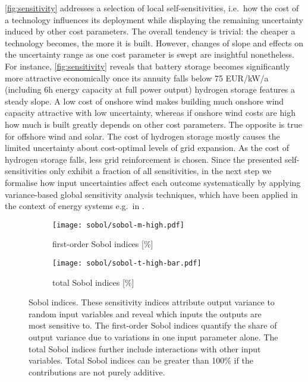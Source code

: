 \cref{fig:sensitivity} addresses a selection of local self-sensitivities, i.e.~how the cost of a technology influences its deployment
while displaying the remaining uncertainty induced by other cost parameters.
The overall tendency is trivial: the cheaper a technology becomes, the more it is built.
However, changes of slope and effects on the uncertainty range 
as one cost parameter is swept are insightful nonetheless.
For instance, \cref{fig:sensitivity} reveals that battery storage becomes significantly more 
attractive economically once its annuity falls below 75 EUR/kW/a
(including 6h energy capacity at full power output) hydrogen storage features a steady slope.
A low cost of onshore wind makes building much onshore wind capacity attractive with low uncertainty,
whereas if onshore wind costs are high how much is built greatly depends on other cost parameters.
The opposite is true for offshore wind and solar. 
The cost of hydrogen storage mostly causes the limited uncertainty about cost-optimal levels of grid expansion.
As the cost of hydrogen storage falls, less grid reinforcement is chosen.
Since the presented self-sensitivities only exhibit a fraction of all sensitivities,
in the next step we formalise how input uncertainties affect each outcome 
systematically by applying variance-based global sensitivity analysis techniques, which
have been applied in the context of energy systems e.g.~in \cite{trondle_trade-offs_2020,mavromatidis_uncertainty_2018}.

\begin{figure}
    \begin{subfigure}[t]{0.45\textwidth}
        \caption{first-order Sobol indices [\%]}
        \label{fig:sobol:first}
        \texttt{[image: sobol/sobol-m-high.pdf]}
    \end{subfigure}
    \begin{subfigure}[t]{0.54\textwidth}
        \caption{total Sobol indices [\%]}
        \label{fig:sobol:total}
        \texttt{[image: sobol/sobol-t-high-bar.pdf]}
    \end{subfigure}
    \caption[First-order and total Sobol indices]{
      Sobol indices. These sensitivity indices attribute output variance to random input variables
      and reveal which inputs the outputs are most sensitive to. The first-order Sobol indices
      quantify the share of output variance due to variations in one input parameter alone.
      The total Sobol indices further include interactions with other input variables.
      Total Sobol indices can be greater than 100\% if the contributions are not purely additive.
    }
    \label{fig:sobol}
\end{figure}

